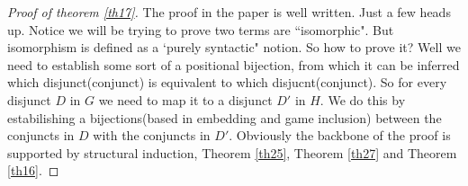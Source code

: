 \documentclass[10pt]{article}
\begin{document}
		\begin{proof}[Proof of theorem \ref{th17}]
			The proof in the paper is well written. Just a few heads up. Notice we will be trying to prove two terms are ``isomorphic". But isomorphism is defined as a `purely syntactic" notion. So how to prove it? Well we need to establish some sort of a positional bijection, from which it can be inferred which disjunct(conjunct) is equivalent to which disjucnt(conjunct). So for every disjunct $D$ in $G$ we need to map it to a disjunct $D'$ in $H$. We do this by estabilishing a bijections(based in embedding and game inclusion) between the conjuncts in $D$ with the conjuncts in $D'$. Obviously the backbone of the proof is supported by structural induction, Theorem \ref{th25}, Theorem \ref{th27} and Theorem \ref{th16}.
		\end{proof}
\end{document}
